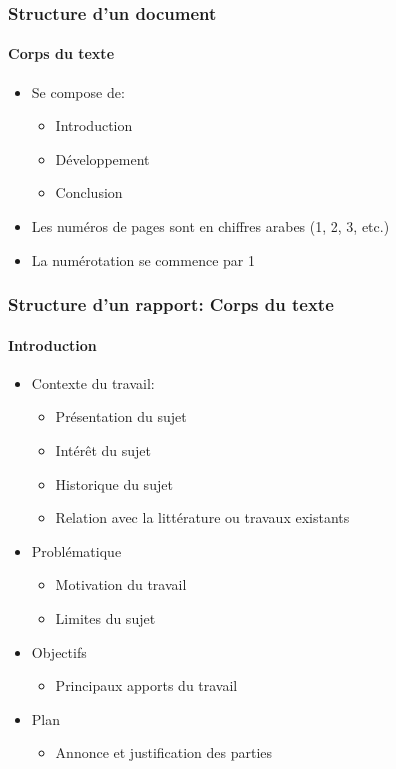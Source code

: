 \documentclass[xcolor=table]{beamer}
\begin{document}
\begin{frame}
\frametitle{Structure d'un document}
\framesubtitle{Corps du texte}

\begin{itemize}
	\item Se compose de: 
	\begin{itemize}
		\item Introduction
		\item Développement  
		\item Conclusion 
	\end{itemize}
	\item Les numéros de pages sont en chiffres arabes (1, 2, 3, etc.) 
	\item La numérotation se commence par 1 
\end{itemize}

\end{frame}

\begin{frame}
\frametitle{Structure d'un rapport: Corps du texte}
\framesubtitle{Introduction}

\begin{minipage}{0.60\textwidth}
	\begin{itemize}
		\item Contexte du travail:
		\begin{itemize}
			\item Présentation du sujet
			\item Intérêt du sujet
			\item Historique du sujet
			\item Relation avec la littérature ou travaux existants
		\end{itemize}
		
		\item Problématique 
		\begin{itemize}
			\item Motivation du travail
			\item Limites du sujet
		\end{itemize}
		
		\item Objectifs 
		\begin{itemize}
			\item Principaux apports du travail
		\end{itemize}
		
		\item Plan 
		\begin{itemize}
			\item Annonce et justification des parties
		\end{itemize}
		
	\end{itemize}
\end{minipage}
\begin{minipage}{0.38\textwidth}
\end{minipage}

\end{frame}
\end{document}
